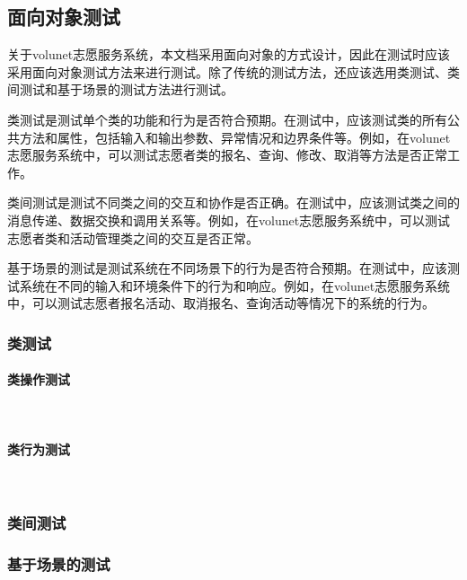 \subsection{面向对象测试}
关于volunet志愿服务系统，本文档采用面向对象的方式设计，因此在测试时应该采用面向对象测试方法来进行测试。除了传统的测试方法，还应该选用类测试、类间测试和基于场景的测试方法进行测试。

类测试是测试单个类的功能和行为是否符合预期。在测试中，应该测试类的所有公共方法和属性，包括输入和输出参数、异常情况和边界条件等。例如，在volunet志愿服务系统中，可以测试志愿者类的报名、查询、修改、取消等方法是否正常工作。

类间测试是测试不同类之间的交互和协作是否正确。在测试中，应该测试类之间的消息传递、数据交换和调用关系等。例如，在volunet志愿服务系统中，可以测试志愿者类和活动管理类之间的交互是否正常。

基于场景的测试是测试系统在不同场景下的行为是否符合预期。在测试中，应该测试系统在不同的输入和环境条件下的行为和响应。例如，在volunet志愿服务系统中，可以测试志愿者报名活动、取消报名、查询活动等情况下的系统的行为。
\subsubsection{类测试}
\paragraph{类操作测试}~{}

\paragraph{类行为测试}~{}

\subsubsection{类间测试}

\subsubsection{基于场景的测试}

\newpage